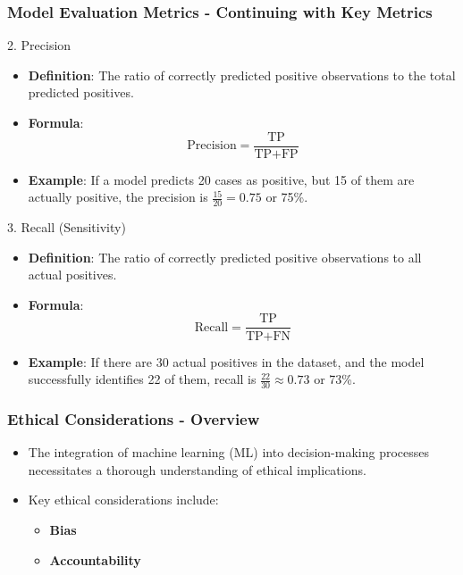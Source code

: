 \documentclass[aspectratio=169]{beamer}
\begin{document}
\begin{frame}[fragile]
    \frametitle{Model Evaluation Metrics - Continuing with Key Metrics}
    \begin{block}{2. Precision}
        \begin{itemize}
            \item \textbf{Definition}: The ratio of correctly predicted positive observations to the total predicted positives.
            \item \textbf{Formula}:
            \begin{equation}
            \text{Precision} = \frac{\text{TP}}{\text{TP} + \text{FP}}
            \end{equation}
            \item \textbf{Example}: If a model predicts 20 cases as positive, but 15 of them are actually positive, the precision is \( \frac{15}{20} = 0.75 \) or 75\%.
        \end{itemize}
    \end{block}

    \begin{block}{3. Recall (Sensitivity)}
        \begin{itemize}
            \item \textbf{Definition}: The ratio of correctly predicted positive observations to all actual positives.
            \item \textbf{Formula}:
            \begin{equation}
            \text{Recall} = \frac{\text{TP}}{\text{TP} + \text{FN}}
            \end{equation}
            \item \textbf{Example}: If there are 30 actual positives in the dataset, and the model successfully identifies 22 of them, recall is \( \frac{22}{30} \approx 0.73 \) or 73\%.
        \end{itemize}
    \end{block}
    
\end{frame}

\begin{frame}[fragile]
    \frametitle{Ethical Considerations - Overview}
    \begin{itemize}
        \item The integration of machine learning (ML) into decision-making processes necessitates a thorough understanding of ethical implications.
        \item Key ethical considerations include:
        \begin{itemize}
            \item \textbf{Bias}
            \item \textbf{Accountability}
        \end{itemize}
    \end{itemize}
\end{frame}
\end{document}
